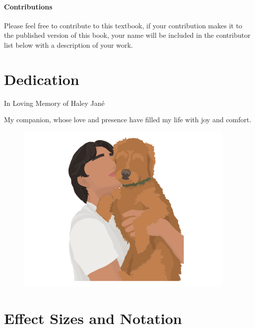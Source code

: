 \documentclass[
  letterpaper,
  DIV=11,
  numbers=noendperiod]{scrreprt}
\begin{document}
\hypertarget{contributions}{%
\subsubsection*{Contributions}\label{contributions}}

Please feel free to contribute to this textbook, if your contribution
makes it to the published version of this book, your name will be
included in the contributor list below with a description of your work.


\hypertarget{dedication}{%
\chapter{Dedication}\label{dedication}}

In Loving Memory of Haley Jané

My companion, whose love and presence have filled my life with joy and
comfort.

\begin{figure}

{\centering \includegraphics[width=4.16667in,height=\textheight]{figure/dedication_2.png}

}

\end{figure}


\hypertarget{effect-sizes-and-notation}{%
\chapter{Effect Sizes and Notation}\label{effect-sizes-and-notation}}
\end{document}
